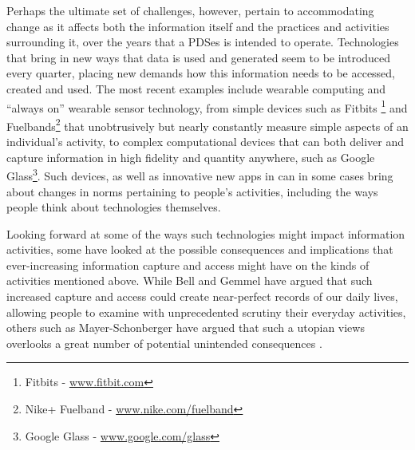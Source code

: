 \documentclass{acm_proc_article-sp}
\begin{document}
Perhaps the ultimate set of challenges, however, pertain to accommodating change as it affects both the information itself and the practices and activities surrounding it, over the years that a PDSes is intended to operate.  Technologies that bring in new ways that data is used and generated seem to be introduced every quarter, placing new demands how this information needs to be accessed, created and used.  The most recent examples include wearable computing and ``always on'' wearable sensor technology, from simple devices such as Fitbits \footnote{Fitbits - \url{www.fitbit.com}} and Fuelbands\footnote{Nike+ Fuelband - \url{www.nike.com/fuelband}} that unobtrusively but nearly constantly measure simple aspects of an individual's activity, to complex computational devices that can both deliver and capture information in high fidelity and quantity anywhere, such as Google Glass\footnote{Google Glass - \url{www.google.com/glass}}.  Such devices, as well as innovative new apps in can in some cases bring about changes in norms pertaining to people's activities, including the ways people think about technologies themselves.


Looking forward at some of the ways such technologies might impact information activities, some have looked at the possible consequences and implications that ever-increasing information capture and access might have on the kinds of activities mentioned above.  While Bell and Gemmel have argued \cite{bell2010total} that such increased capture and access could create near-perfect records of our daily lives, allowing people to examine with unprecedented scrutiny their everyday activities, others such as Mayer-Schonberger have argued that such a utopian views overlooks a great number of potential unintended consequences \cite{mayer-schonberger2013}.   

\end{document}
